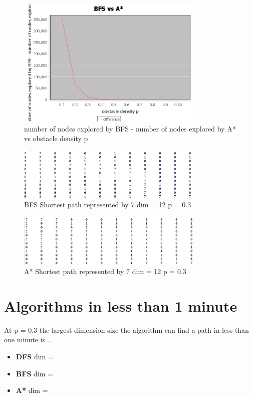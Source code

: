\documentclass{article}
\begin{document}
   \begin{figure}[hpt]
   \centering
\includegraphics[width=3.5in]{BFSvA}

\caption{number of nodes explored by BFS - number of nodes explored by A* vs obstacle density p}
\label{fig:figure3}

\end{figure}
   
   \begin{figure}[hpt]
   \centering
\includegraphics[width=3.5in]{BFS}

\caption{BFS Shortest path represented by 7 dim = 12 p = 0.3}
\label{fig:figure4}

\end{figure}

 \begin{figure}[hpt]
   \centering
\includegraphics[width=3.5in]{astar}

\caption{A* Shortest path represented by 7 dim = 12 p = 0.3}
\label{fig:figure5}

\end{figure}

\bigskip
\bigskip

\section{Algorithms in less than 1 minute}	
At p = 0.3 the largest dimension size the algorithm can find a path in less than one minute is...
\begin{itemize}
\item \textbf{DFS} dim = 
\item \textbf{BFS} dim =
\item \textbf{A*}  dim =
\end{itemize}
\end{document}
